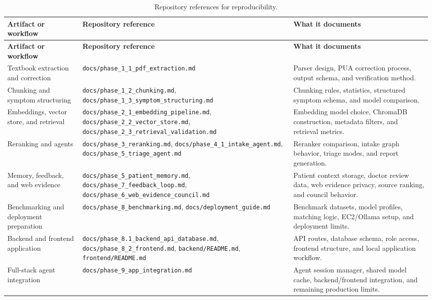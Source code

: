 \begin{longtable}{p{} p{} p{}}
\caption{Repository references for reproducibility.}
\label{tab:reproducibility_references}\\
\toprule
\textbf{Artifact or workflow} & \textbf{Repository reference} & \textbf{What it documents}\\
\midrule
\endfirsthead
\toprule
\textbf{Artifact or workflow} & \textbf{Repository reference} & \textbf{What it documents}\\
\midrule
\endhead
Textbook extraction and correction & \texttt{docs/phase\_1\_1\_pdf\_extraction.md} & Parser design, PUA correction process, output schema, and verification method.\\
Chunking and symptom structuring & \texttt{docs/phase\_1\_2\_chunking.md}, \texttt{docs/phase\_1\_3\_symptom\_structuring.md} & Chunking rules, statistics, structured symptom schema, and model comparison.\\
Embeddings, vector store, and retrieval & \texttt{docs/phase\_2\_1\_embedding\_pipeline.md}, \texttt{docs/phase\_2\_2\_vector\_store.md}, \texttt{docs/phase\_2\_3\_retrieval\_validation.md} & Embedding model choice, ChromaDB construction, metadata filters, and retrieval metrics.\\
Reranking and agents & \texttt{docs/phase\_3\_reranking.md}, \texttt{docs/phase\_4\_1\_intake\_agent.md}, \texttt{docs/phase\_5\_triage\_agent.md} & Reranker comparison, intake graph behavior, triage modes, and report generation.\\
Memory, feedback, and web evidence & \texttt{docs/phase\_5\_patient\_memory.md}, \texttt{docs/phase\_7\_feedback\_loop.md}, \texttt{docs/phase\_6\_web\_evidence\_council.md} & Patient context storage, doctor review data, web evidence privacy, source ranking, and council behavior.\\
Benchmarking and deployment preparation & \texttt{docs/phase\_8\_benchmarking.md}, \texttt{docs/deployment\_guide.md} & Benchmark datasets, model profiles, matching logic, EC2/Ollama setup, and deployment limits.\\
Backend and frontend application & \texttt{docs/phase\_8.1\_backend\_api\_database.md}, \texttt{docs/phase\_8\_2\_frontend.md}, \texttt{backend/README.md}, \texttt{frontend/README.md} & API routes, database schema, role access, frontend structure, and local application workflow.\\
Full-stack agent integration & \texttt{docs/phase\_9\_app\_integration.md} & Agent session manager, shared model cache, backend/frontend integration, and remaining production limits.\\
\bottomrule
\end{longtable}

